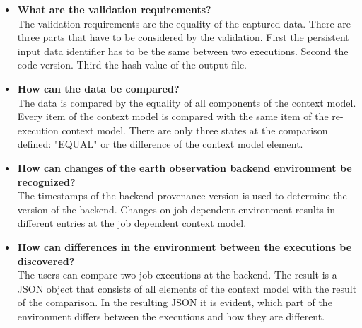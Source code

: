 \documentclass[draft,final]{vutinfth} %
\begin{document}
\begin{itemize}
	\begin{itemize}
		\item \textbf{What are the validation requirements?} \\
		The validation requirements are the equality of the captured data. There are three parts that have to be considered by the validation. First the persistent input data identifier has to be the same between two executions. Second the code version. Third the hash value of the output file.
		\item \textbf{How can the data be compared?} \\
		The data is compared by the equality of all components of the context model. Every item of the context model is compared with the same item of the re-execution context model. There are only three states at the comparison defined: "EQUAL" or the difference of the context model element.
		\item \textbf{How can changes of the earth observation backend environment be recognized?} \\
		The timestamps of the backend provenance version is used to determine the version of the backend. Changes on job dependent environment results in different entries at the job dependent context model.  
		\item \textbf{How can differences in the environment between the executions be discovered?} \\
		The users can compare two job executions at the backend. The result is a JSON object that consists of all elements of the context model with the result of the comparison. In the resulting JSON it is evident, which part of the environment differs between the executions and how they are different.  
	\end{itemize}
\end{itemize}
\end{document}
